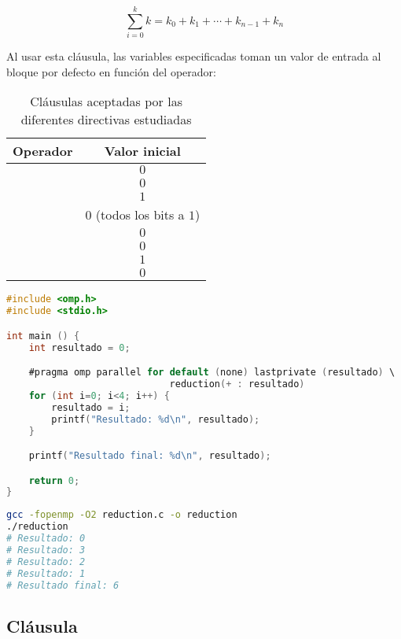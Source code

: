 \[\sum_{i=0}^{k}k=k_0+k_1+\cdots+k_{n-1}+k_n\]

Al usar esta cláusula, las variables especificadas toman un valor de entrada al bloque por defecto en función del operador:

\begin{table}[!h]
	\begin{center}
		\begin{tabular}{c c}
			\textbf{Operador} & \textbf{Valor inicial}     \\
			\toprule
			\code{+}          & $0$                        \\
			\code{-}          & $0$                        \\
			\code{*}          & $1$                        \\
			\code{\&}         & $0$ (todos los bits a $1$) \\
			\code{|}          & $0$                        \\
			\code{\^{}}       & $0$                        \\
			\code{\&\&}       & $1$                        \\
			\code{||}         & $0$                        \\
		\end{tabular}
	\end{center}
	\caption{Cláusulas aceptadas por las diferentes directivas estudiadas}\label{clausulas-omp-definiciones-aceptacion}
\end{table}

\begin{lstlisting}[language=C]
#include <omp.h>
#include <stdio.h>

int main () {
	int resultado = 0;

	#pragma omp parallel for default (none) lastprivate (resultado) \
	                         reduction(+ : resultado)
	for (int i=0; i<4; i++) {
		resultado = i;
		printf("Resultado: %d\n", resultado);
	}

	printf("Resultado final: %d\n", resultado);

	return 0;
}
\end{lstlisting}

\begin{lstlisting}[language=sh]
gcc -fopenmp -O2 reduction.c -o reduction
./reduction
# Resultado: 0
# Resultado: 3
# Resultado: 2
# Resultado: 1
# Resultado final: 6
\end{lstlisting}

\subsection{Cláusula }

